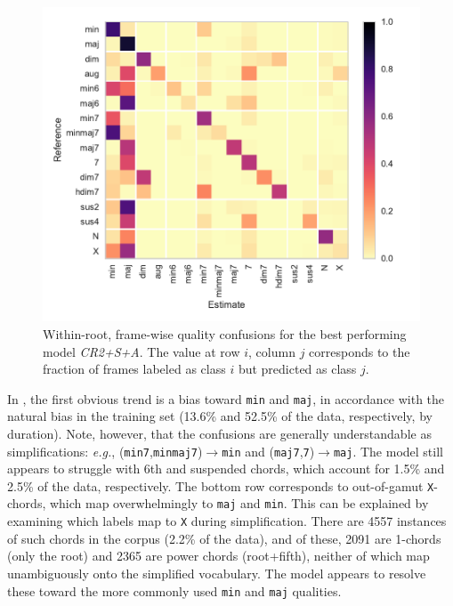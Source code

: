 \documentclass{article}
\def\eg{\emph{e.g.}}
\begin{document}
\begin{figure}
    \centering
    \includegraphics[width=\columnwidth]{qualconf}
    \caption{Within-root, frame-wise quality confusions for the best performing model \emph{CR2+S+A}.
    The value at row $i$, column $j$ corresponds to the fraction of frames labeled as class $i$ but predicted as class $j$.\label{fig:confusion}}
\end{figure}

In , the first obvious trend is a bias toward \texttt{min} and \texttt{maj}, in accordance with the natural bias in the training set (13.6\% and 52.5\% of the data, respectively, by duration).
Note, however, that the confusions are generally understandable as simplifications: \eg, (\texttt{min7},\texttt{minmaj7})$\rightarrow$\texttt{min} and (\texttt{maj7},\texttt{7})$\rightarrow$\texttt{maj}.
The model still appears to struggle with 6th and suspended chords, which account for 1.5\% and 2.5\% of the data, respectively.
The bottom row corresponds to out-of-gamut \texttt{X}-chords, which map overwhelmingly to \texttt{maj} and \texttt{min}.
This can be explained by examining which labels map to \texttt{X} during simplification.
There are 4557 instances of such chords in the corpus (2.2\% of the data), and of these, 2091 are 1-chords (only the root) and 2365 are power chords (root+fifth), neither of which map unambiguously onto the simplified vocabulary.
The model appears to resolve these toward the more commonly used \texttt{min} and \texttt{maj} qualities.
\end{document}
